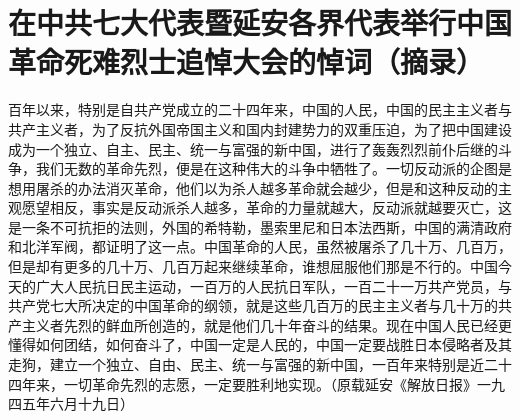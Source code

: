 \section[在中共七大代表暨延安各界代表举行中国革命死难烈士追悼大会的悼词（摘录）（一九四五年六月十七日）]{在中共七大代表暨延安各界代表举行中国革命死难烈士追悼大会的悼词（摘录）}


百年以来，特别是自共产党成立的二十四年来，中国的人民，中国的民主主义者与共产主义者，为了反抗外国帝国主义和国内封建势力的双重压迫，为了把中国建设成为一个独立、自主、民主、统一与富强的新中国，进行了轰轰烈烈前仆后继的斗争，我们无数的革命先烈，便是在这种伟大的斗争中牺牲了。一切反动派的企图是想用屠杀的办法消灭革命，他们以为杀人越多革命就会越少，但是和这种反动的主观愿望相反，事实是反动派杀人越多，革命的力量就越大，反动派就越要灭亡，这是一条不可抗拒的法则，外国的希特勒，墨索里尼和日本法西斯，中国的满清政府和北洋军阀，都证明了这一点。中国革命的人民，虽然被屠杀了几十万、几百万，但是却有更多的几十万、几百万起来继续革命，谁想屈服他们那是不行的。中国今天的广大人民抗日民主运动，一百万的人民抗日军队，一百二十一万共产党员，与共产党七大所决定的中国革命的纲领，就是这些几百万的民主主义者与几十万的共产主义者先烈的鲜血所创造的，就是他们几十年奋斗的结果。现在中国人民已经更懂得如何团结，如何奋斗了，中国一定是人民的，中国一定要战胜日本侵略者及其走狗，建立一个独立、自由、民主、统一与富强的新中国，一百年来特别是近二十四年来，一切革命先烈的志愿，一定要胜利地实现。（原载延安《解放日报》一九四五年六月十九日）

